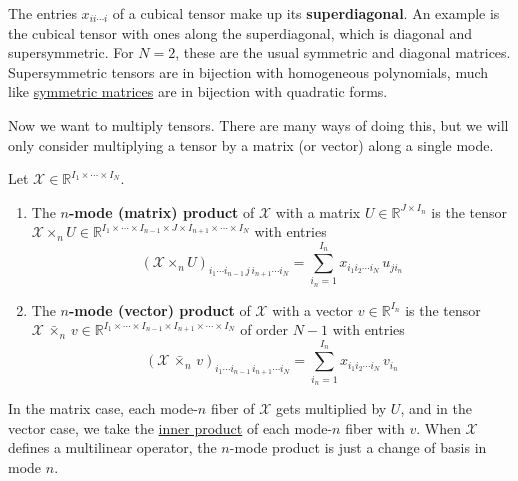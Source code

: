   The entries $x_{ii \cdots i}$ of a cubical tensor make up its \textbf{superdiagonal}. An example is the cubical tensor with ones along the superdiagonal, which is diagonal and supersymmetric. For $N = 2$, these are the usual symmetric and diagonal matrices. Supersymmetric tensors are in bijection with homogeneous polynomials, much like \hyperref[lin-def:symmetric-matrices]{symmetric matrices} are in bijection with quadratic forms.

  Now we want to multiply tensors. There are many ways of doing this, but we will only consider multiplying a tensor by a matrix (or vector) along a single mode.

  \begin{definition}
    \label{def:n-mode-product}
    Let $\mathcal{X} \in \mathbb{R}^{I_1 \times \cdots \times I_N}$.
    \begin{enumerate}
      \item The \textbf{$n$-mode (matrix) product} of $\mathcal{X}$ with a matrix $U \in \mathbb{R}^{J \times I_n}$ is the tensor $\mathcal{X} \times_n U \in \mathbb{R}^{I_1 \times \cdots \times I_{n-1} \times J \times I_{n+1} \times \cdots \times I_N}$ with entries
      \begin{equation}
        (\mathcal{X} \times_n U)_{i_1 \cdots i_{n-1} \, j \, i_{n+1} \cdots i_N} = \sum_{i_n = 1}^{I_n} x_{i_1 i_2 \cdots i_N} \, u_{j i_n}
      \end{equation}

      \item The \textbf{$n$-mode (vector) product} of $\mathcal{X}$ with a vector $v \in \mathbb{R}^{I_n}$ is the tensor $\mathcal{X} \,\bar{\times}_n\, v \in \mathbb{R}^{I_1 \times \cdots \times I_{n-1} \times I_{n+1} \times \cdots \times I_N}$ of order $N - 1$ with entries
      \begin{equation}
        (\mathcal{X} \,\bar{\times}_n\, v)_{i_1 \cdots i_{n-1} \, i_{n+1} \cdots i_N} = \sum_{i_n = 1}^{I_n} x_{i_1 i_2 \cdots i_N} \, v_{i_n}
      \end{equation}
    \end{enumerate}
  \end{definition}

  In the matrix case, each mode-$n$ fiber of $\mathcal{X}$ gets multiplied by $U$, and in the vector case, we take the \hyperref[lin-def:inner-product]{inner product} of each mode-$n$ fiber with $v$. When $\mathcal{X}$ defines a multilinear operator, the $n$-mode product is just a change of basis in mode $n$.

